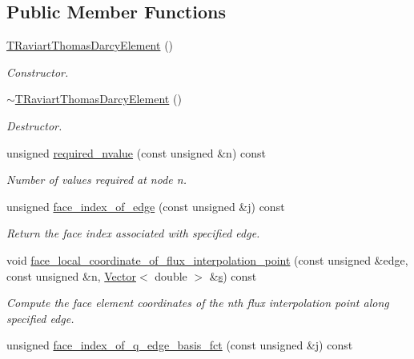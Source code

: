 \subsection*{Public Member Functions}
\begin{DoxyCompactItemize}
\item 
\hyperlink{classoomph_1_1TRaviartThomasDarcyElement_adb308fe884526fe0122b49d112e49b7a}{T\+Raviart\+Thomas\+Darcy\+Element} ()
\begin{DoxyCompactList}\small\item\em Constructor. \end{DoxyCompactList}\item 
\hyperlink{classoomph_1_1TRaviartThomasDarcyElement_a6f564e44204a60ea04eb6077d32ecb85}{$\sim$\+T\+Raviart\+Thomas\+Darcy\+Element} ()
\begin{DoxyCompactList}\small\item\em Destructor. \end{DoxyCompactList}\item 
unsigned \hyperlink{classoomph_1_1TRaviartThomasDarcyElement_a35bdfb84cea500e383c72cedfe09f933}{required\+\_\+nvalue} (const unsigned \&n) const
\begin{DoxyCompactList}\small\item\em Number of values required at node n. \end{DoxyCompactList}\item 
unsigned \hyperlink{classoomph_1_1TRaviartThomasDarcyElement_a194a2f0a34700b490e937459a40420d9}{face\+\_\+index\+\_\+of\+\_\+edge} (const unsigned \&j) const
\begin{DoxyCompactList}\small\item\em Return the face index associated with specified edge. \end{DoxyCompactList}\item 
void \hyperlink{classoomph_1_1TRaviartThomasDarcyElement_a21436d43ed647f9c0aeb56fe776d63cd}{face\+\_\+local\+\_\+coordinate\+\_\+of\+\_\+flux\+\_\+interpolation\+\_\+point} (const unsigned \&edge, const unsigned \&n, \hyperlink{classoomph_1_1Vector}{Vector}$<$ double $>$ \&\hyperlink{cfortran_8h_ab7123126e4885ef647dd9c6e3807a21c}{s}) const
\begin{DoxyCompactList}\small\item\em Compute the face element coordinates of the nth flux interpolation point along specified edge. \end{DoxyCompactList}\item 
unsigned \hyperlink{classoomph_1_1TRaviartThomasDarcyElement_a7abc470b07eb3e492b4aed3555734548}{face\+\_\+index\+\_\+of\+\_\+q\+\_\+edge\+\_\+basis\+\_\+fct} (const unsigned \&j) const

\end{DoxyCompactItemize}
